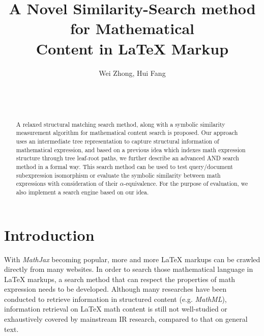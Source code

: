 \documentclass{acm_proc_article-sp}
\begin{document}
\title{A Novel Similarity-Search method for Mathematical \\ Content in {\ttlit LaTeX} Markup}

\author{
\alignauthor Wei Zhong,\; Hui Fang\\
       \\
       \\
       \\
}

\maketitle
\begin{abstract}
A relaxed structural matching search method, along with a symbolic similarity measurement algorithm for mathematical content search is proposed. 
Our approach uses an intermediate tree representation to capture structural information of mathematical expression, and based on a previous idea which indexes math expression structure through tree leaf-root paths, we further describe an advanced AND search method in a formal way. This search method can be used to test query/document subexpression isomorphism or evaluate the symbolic similarity between math expressions with consideration of their $\alpha$-equivalence. 
For the purpose of evaluation, we also implement a search engine based on our idea. 
\end{abstract}



\section{Introduction}
With \textit{MathJax} becoming popular, more and more \LaTeX{} markups can be crawled directly from many websites. 
In order to search those mathematical language in \LaTeX{} markups, a search method that can respect the properties of math expression needs to be developed. 
Although many researches have been conducted to retrieve information in structured content (e.g. \textit{MathML}), information retrieval on \LaTeX{} math content is still not well-studied or exhaustively covered by mainstream IR research, compared to that on general text.
\end{document}

